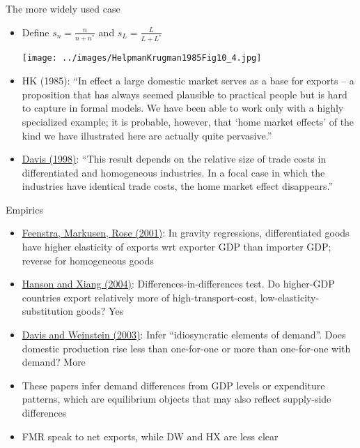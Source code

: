 \documentclass[10pt,notes=hide]{beamer}
\begin{document}
\begin{frame}{The more widely used case}
\linespread{1.0}
\begin{itemize}
	\item Define $s_n = \frac{n}{n+n^*}$ and $s_L = \frac{L}{L+L^*}$
	\begin{center}\texttt{[image: ../images/HelpmanKrugman1985Fig10\_4.jpg]}\end{center}
	\item {\small HK (1985):  ``In effect a large domestic market serves as a base for exports -- a proposition that has always seemed plausible to practical people but is hard to capture in formal models. We have been able to work only with a highly specialized example; it is probable, however, that `home market effects' of the kind we have illustrated here are actually quite pervasive.''}
	\item {\small \href{http://www.jstor.org/stable/116870}{Davis (1998)}: ``This result depends on the relative size of trade costs in differentiated and homogeneous industries. In a focal case in which the industries have identical trade costs, the home market effect disappears.''}
\end{itemize}
\end{frame}
\begin{frame}{Empirics}
\begin{itemize}
	\item \href{http://onlinelibrary.wiley.com/doi/10.1111/0008-4085.00082/abstract}{Feenstra, Markusen, Rose (2001)}: In gravity regressions, differentiated goods have higher elasticity of exports wrt exporter GDP than importer GDP; reverse for homogeneous goods
	\item \href{https://www.aeaweb.org/articles?id=10.1257/0002828042002688}{Hanson and Xiang (2004)}: Differences-in-differences test. Do higher-GDP countries export relatively more of high-transport-cost, low-elasticity-substitution goods? Yes
	\item \href{http://www.sciencedirect.com/science/article/pii/S0022199602000880}{Davis and Weinstein (2003)}: Infer ``idiosyncratic elements of demand''. Does domestic production rise less than one-for-one or more than one-for-one with demand? More
	\item These papers infer demand differences from GDP levels or expenditure patterns, which are equilibrium objects that may also reflect supply-side differences
	\item FMR speak to net exports, while DW and HX are less clear
\end{itemize}
\end{frame}
\end{document}
